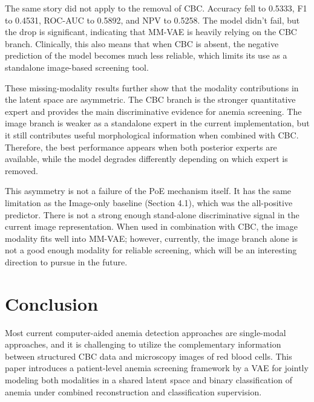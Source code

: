 \documentclass[conference]{IEEEtran}
\begin{document}
The same story did not apply to the removal of CBC. Accuracy fell to 0.5333, F1 to 0.4531, ROC-AUC to 0.5892, and NPV to 0.5258. The model didn't fail, but the drop is significant, indicating that MM-VAE is heavily relying on the CBC branch. Clinically, this also means that when CBC is absent, the negative prediction of the model becomes much less reliable, which limits its use as a standalone image-based screening tool.

These missing-modality results further show that the modality contributions in the latent space are asymmetric. The CBC branch is the stronger quantitative expert and provides the main discriminative evidence for anemia screening. The image branch is weaker as a standalone expert in the current implementation, but it still contributes useful morphological information when combined with CBC. Therefore, the best performance appears when both posterior experts are available, while the model degrades differently depending on which expert is removed.

This asymmetry is not a failure of the PoE mechanism itself. It has the same limitation as the Image-only baseline (Section 4.1), which was the all-positive predictor. There is not a strong enough stand-alone discriminative signal in the current image representation. When used in combination with CBC, the image modality fits well into MM-VAE; however, currently, the image branch alone is not a good enough modality for reliable screening, which will be an interesting direction to pursue in the future.

\FloatBarrier

\section{Conclusion}

Most current computer-aided anemia detection approaches are single-modal approaches, and it is challenging to utilize the complementary information between structured CBC data and microscopy images of red blood cells. This paper introduces a patient-level anemia screening framework by a VAE for jointly modeling both modalities in a shared latent space and binary classification of anemia under combined reconstruction and classification supervision.
\end{document}
